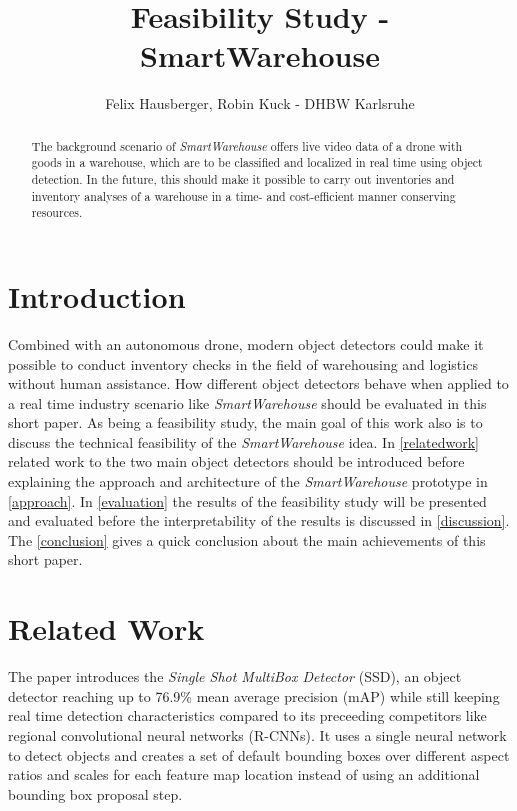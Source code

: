 \documentclass[a4paper, 10pt, journal]{wissarbIEEE}      %
\title{\LARGE \bf Feasibility Study - SmartWarehouse}
\author{Felix Hausberger, Robin Kuck - DHBW Karlsruhe}
\begin{document}
\maketitle

\begin{abstract}

The background scenario of \textit{SmartWarehouse} offers live video data of a drone with goods in a warehouse, which are to be classified and localized in real time using object detection. In the future, this should make it possible to carry out inventories and inventory analyses of a warehouse in a time- and cost-efficient manner conserving resources.

\end{abstract}

\section{Introduction}

Combined with an autonomous drone, modern object detectors could make it possible to conduct inventory checks in the field of warehousing and logistics without human assistance. How different object detectors behave when applied to a real time industry scenario like \textit{SmartWarehouse} should be evaluated in this short paper. As being a feasibility study, the main goal of this work also is to discuss the technical feasibility of the \textit{SmartWarehouse} idea. In \autoref{relatedwork} related work to the two main object detectors should be introduced before explaining the approach and architecture of the \textit{SmartWarehouse} prototype in \autoref{approach}. In \autoref{evaluation} the results of the feasibility study will be presented and evaluated before the interpretability of the results is discussed in \autoref{discussion}. The \autoref{conclusion} gives a quick conclusion about the main achievements of this short paper.

\section{Related Work} \label{relatedwork}

The paper \cite{WeiLiuDragomirAnguelovDumitruErhanChristianSzegedyScottReedChengYangFuAlexander.2016} introduces the \textit{Single Shot MultiBox Detector} (SSD), an object detector reaching up to 76.9\% mean average precision (mAP) while still keeping real time detection characteristics compared to its preceeding competitors like regional convolutional neural networks (R-CNNs). It uses a single neural network to detect objects and creates a set of default bounding boxes over different aspect ratios and scales for each feature map location instead of using an additional bounding box proposal step. 
\end{document}
